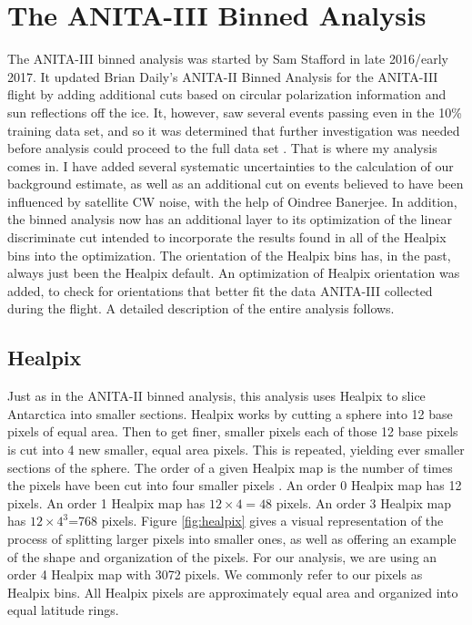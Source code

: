\section{The ANITA-III Binned Analysis}

The ANITA-III binned analysis was started by Sam Stafford in late 2016/early 2017.  It updated Brian Daily's ANITA-II Binned Analysis for the ANITA-III flight by adding additional cuts based on circular polarization information and sun reflections off the ice.  It, however, saw several events passing even in the 10\% training data set, and so it was determined that further investigation was needed before analysis could proceed to the full data set \cite{sam}.  
That is where my analysis comes in.  I have added several systematic uncertainties to the calculation of our background estimate, as well as an additional cut on events believed to have been influenced by satellite CW noise, with the help of Oindree Banerjee.  In addition, the binned analysis now has an additional layer to its optimization of the linear discriminate cut intended to incorporate the results found in all of the Healpix bins into the optimization.  The orientation of the Healpix bins has, in the past, always just been the Healpix default.  An optimization of Healpix orientation was added, to check for orientations that better fit the data ANITA-III collected during the flight.  A detailed description of the entire analysis follows.

\subsection{Healpix} 

Just as in the ANITA-II binned analysis, this analysis uses Healpix to slice Antarctica into smaller sections.  Healpix works by cutting a sphere into 12 base pixels of equal area.  Then to get finer, smaller pixels each of those 12 base pixels is cut into 4 new smaller, equal area pixels. This is repeated, yielding ever smaller sections of the sphere.  The order of a given Healpix map is the number of times the pixels have been cut into four smaller pixels \cite{Healpix}.  An order 0 Healpix map has 12 pixels.  An order 1 Healpix map has $12 \times 4=48$ pixels.  An order 3 Healpix map has $12 \times 4^3$=768 pixels.  Figure \ref{fig:healpix} gives a visual representation of the process of splitting larger pixels into smaller ones, as well as offering an example of the shape and organization of the pixels.  For our analysis, we are using an order 4 Healpix map with 3072 pixels.  We commonly refer to our pixels as Healpix bins.  All Healpix pixels are approximately equal area and organized into equal latitude rings.  

